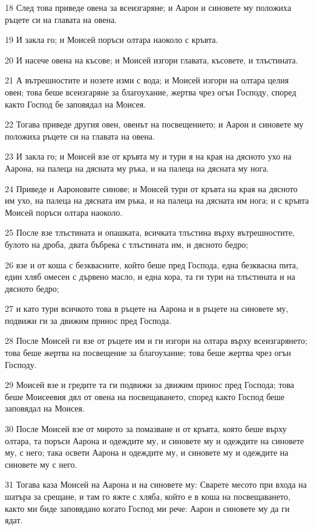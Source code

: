 \par 18 След това приведе овена за всеизгаряне; и Аарон и синовете му положиха ръцете си на главата на овена.
\par 19 И закла го; и Моисей поръси олтара наоколо с кръвта.
\par 20 И насече овена на късове; и Моисей изгори главата, късовете, и тлъстината.
\par 21 А вътрешностите и нозете изми с вода; и Моисей изгори на олтара целия овен; това беше всеизгаряне за благоухание, жертва чрез огън Господу, според както Господ бе заповядал на Моисея.
\par 22 Тогава приведе другия овен, овенът на посвещението; и Аарон и синовете му положиха ръцете си на главата на овена.
\par 23 И закла го; и Моисей взе от кръвта му и тури я на края на дясното ухо на Аарона, на палеца на дясната му ръка, и на палеца на дясната му нога.
\par 24 Приведе и Аароновите синове; и Моисей тури от кръвта на края на дясното им ухо, на палеца на дясната им ръка, и на палеца на дясната им нога; и с кръвта Моисей поръси олтара наоколо.
\par 25 После взе тлъстината и опашката, всичката тлъстина върху вътрешностите, булото на дроба, двата бъбрека с тлъстината им, и дясното бедро;
\par 26 взе и от коша с безквасните, който беше пред Господа, една безквасна пита, един хляб омесен с дървено масло, и една кора, та ги тури на тлъстината и на дясното бедро;
\par 27 и като тури всичкото това в ръцете на Аарона и в ръцете на синовете му, подвижи ги за движим принос пред Господа.
\par 28 После Моисей ги взе от ръцете им и ги изгори на олтара върху всеизгарянето; това беше жертва на посвещение за благоухание; това беше жертва чрез огън Господу.
\par 29 Моисей взе и гредите та ги подвижи за движим принос пред Господа; това беше Моисеевия дял от овена на посвещаването, според както Господ беше заповядал на Моисея.
\par 30 После Моисей взе от мирото за помазване и от кръвта, която беше върху олтара, та поръси Аарона и одеждите му, и синовете му и одеждите на синовете му, с него; така освети Аарона и одеждите му, и синовете му и одеждите на синовете му с него.
\par 31 Тогава каза Моисей на Аарона и на синовете му: Сварете месото при входа на шатъра за срещане, и там го яжте с хляба, който е в коша на посвещаването, както ми биде заповядано когато Господ ми рече: Аарон и синовете му да ги ядат.
